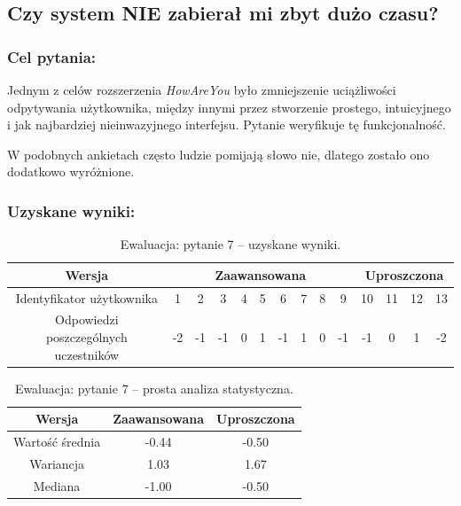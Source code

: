 	
	
\subsection{Czy system NIE zabierał mi zbyt dużo czasu?}
	
	\subsubsection{Cel pytania:}
	
	Jednym z celów rozszerzenia \textit{HowAreYou} było zmniejszenie uciążliwości odpytywania użytkownika, między innymi przez stworzenie prostego, intuicyjnego i jak najbardziej nieinwazyjnego interfejsu. Pytanie weryfikuje tę funkcjonalność.
	
	W podobnych ankietach często ludzie pomijają słowo nie, dlatego zostało ono dodatkowo wyróżnione.
	
	\subsubsection{Uzyskane wyniki:}
	
	\begin{table}[!h]
		\caption{Ewaluacja: pytanie 7 -- uzyskane wyniki.}
		\centering
		\begin{tabular}{|c|c|c|c|c|c|c|c|c|c|c|c|c|c|}
			\hline
			Wersja &  \multicolumn{9}{c|}{Zaawansowana} & \multicolumn{4}{c|}{Uproszczona}\\ \hline
			Identyfikator użytkownika             & 1 & 2 & 3 & 4 & 5 & 6 & 7 & 8 & 9 
			& 10 & 11 & 12 & 13 \\ \hline
			Odpowiedzi poszczególnych uczestników & -2 & -1 & -1 & 0 & 1 & -1 & 1 & 0 & -1
			& -1 & 0 & 1 & -2     \\ \hline
		\end{tabular}
	\end{table}
	
	\begin{table}[!h]
		\caption{Ewaluacja: pytanie 7 -- prosta analiza statystyczna.}
		\centering
		\begin{tabular}{|c|c|c|}
			\hline
			Wersja          & Zaawansowana & Uproszczona \\ \hline
			Wartość średnia & -0.44        & -0.50       \\ \hline
			Wariancja       &  1.03        &  1.67       \\ \hline
			Mediana         & -1.00        & -0.50       \\ \hline
		\end{tabular}
	\end{table}
	
